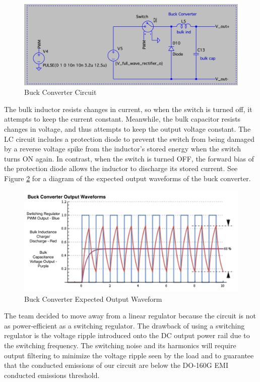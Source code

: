 \documentclass[conference]{IEEEtran}
\begin{document}
\begin{figure}[htp]
    \centering
    \includegraphics[width=1.0\linewidth]{buck_converter_circuit.png}
    \caption{Buck Converter Circuit}
    \label{fig:buck_converter_circuit_diagram}
\end{figure}

The bulk inductor resists changes in current, so when the switch is turned off, it attempts to keep the current constant. Meanwhile, the bulk capacitor resists changes in voltage, and thus attempts to keep the output voltage constant. The LC circuit includes a protection diode to prevent the switch from being damaged by a reverse voltage spike from the inductor's stored energy when the switch turns ON again. In contrast, when the switch is turned OFF, the forward bias of the protection diode allows the inductor to discharge its stored current. See Figure \ref{fig:buck_converter_waveform_diagram} for a diagram of the expected output waveforms of the buck converter.

\begin{figure}[htp]
    \centering
    \includegraphics[width=1.0\linewidth]{buck_converter_waveform.png}
    \caption{Buck Converter Expected Output Waveform}
    \label{fig:buck_converter_waveform_diagram}
\end{figure}

The team decided to move away from a linear regulator because the circuit is not as power-efficient as a switching regulator. The drawback of using a switching regulator is the voltage ripple introduced onto the DC output power rail due to the switching frequency. The switching noise and its harmonics will require output filtering to minimize the voltage ripple seen by the load and to guarantee that the conducted emissions of our circuit are below the DO-160G EMI conducted emissions threshold. 
\end{document}
